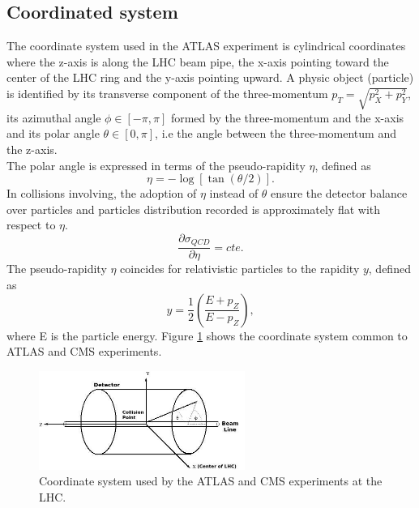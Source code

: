 \subsection{Coordinated system}
\label{chap2:ATLAS:CS}
The coordinate system used in the ATLAS experiment is cylindrical coordinates where the z-axis is along the LHC beam pipe, the x-axis pointing toward the center of the LHC ring and the y-axis pointing upward. A physic object (particle) is identified by its transverse component of the three-momentum $p_T = \sqrt{p_X^2 + p_Y^2}$, its azimuthal angle $\phi \in [-\pi,\pi] $ formed by the three-momentum and the x-axis and its polar angle $\theta \in [0,\pi]$, i.e the angle between the three-momentum and the z-axis. \\
The polar angle is expressed in terms of the pseudo-rapidity $\eta$, defined as
\begin{equation}
\eta = -\log[\tan(\theta/2)].
\end{equation}
In collisions involving, the adoption of $\eta$ instead of $\theta$ ensure the detector balance over particles and particles distribution recorded is approximately flat with respect to $\eta$.
\begin{equation}
\frac{\partial\sigma_{QCD}}{\partial\eta} = cte.
\end{equation}
The pseudo-rapidity $\eta$ coincides for relativistic particles to the rapidity $y$, defined as 
\begin{equation}
y = \frac{1}{2}(\frac{E+p_Z}{E-p_Z}),
\end{equation}
where E is the particle energy.
Figure \ref{fig:chap2:ATLAS:SYS} shows the coordinate system common to ATLAS and CMS experiments.
\begin{figure}[htbp]
    \centering
    \includegraphics[width=0.6\textwidth]{Ch2/Img/ATLAS_Sys.jpeg}
    \caption{Coordinate system used by the ATLAS and CMS experiments at the LHC.}
    \label{fig:chap2:ATLAS:SYS}
\end{figure}

